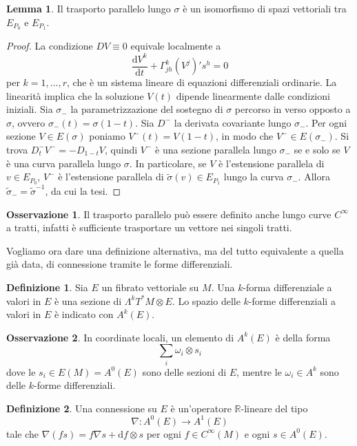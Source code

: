 \documentclass[a4paper,11pt]{article}
\theoremstyle{definition}
\newtheorem{osservazione}{Osservazione}[section]
\newtheorem{definizione}{Definizione}[section]
\theoremstyle{theorem}
\newtheorem{lemma}[teorema]{Lemma}
\newcommand{\dif}{\mathrm{d}}
\newcommand{\R}{\mathbb{R}}
\begin{document}
\begin{lemma}
	Il trasporto parallelo lungo $\sigma$ è un isomorfismo di spazi vettoriali tra $E_{P_0}$ e $E_{P_1}$.
\end{lemma}
\begin{proof}
	La condizione $DV\equiv0$ equivale localmente a
	\[\frac{\dif V^k}{\dif t}+\Gamma^k_{jh}\left(V^j\right)'s^h=0\]
	per $k=1,\dots,r$, che è un sistema lineare di equazioni differenziali ordinarie. La linearità implica che la soluzione $V(t)$ dipende linearmente dalle condizioni iniziali. Sia $\sigma_{-}$ la parametrizzazione del sostegno di $\sigma$ percorso in verso opposto a $\sigma$, ovvero $\sigma_-(t)=\sigma(1-t)$. Sia $D^-$ la derivata covariante lungo $\sigma_-$. Per ogni sezione $V\in E(\sigma)$ poniamo $V^-(t)=V(1-t)$, in modo che $V^-\in E(\sigma_-)$. Si trova $D^-_tV^-=-D_{1-t}V$, quindi $V^-$ è una sezione parallela lungo $\sigma_-$ se e solo se $V$ è una curva parallela lungo $\sigma$. In particolare, se $V$ è l'estensione parallela di $v\in E_{P_0}$, $V^-$ è l'estensione parallela di $\tilde{\sigma}(v)\in E_{P_1}$ lungo la curva $\sigma_-$. Allora $\tilde{\sigma}_-=\tilde{\sigma}^{-1}$, da cui la tesi.
\end{proof}
\begin{osservazione}
	Il trasporto parallelo può essere definito anche lungo curve $C^\infty$ a tratti, infatti è sufficiente trasportare un vettore nei singoli tratti.
\end{osservazione}
Vogliamo ora dare una definizione alternativa, ma del tutto equivalente a quella già data, di connessione tramite le forme differenziali.
\begin{definizione}
	Sia $E$ un fibrato vettoriale su $M$. Una $k$-forma differenziale a valori in $E$ è una sezione di $\Lambda^k T^*M\otimes E$. Lo spazio delle $k$-forme differenziali a valori in $E$ è indicato con $A^k(E)$.
\end{definizione}
\begin{osservazione}
	In coordinate locali, un elemento di $A^k(E)$ è della forma
	\[\sum_i\omega_i\otimes s_i\]
	dove le $s_i\in E(M)=A^0(E)$ sono delle sezioni di $E$, mentre le $\omega_i\in A^k$ sono delle $k$-forme differenziali.
\end{osservazione}
\begin{definizione}
	Una connessione su $E$ è un'operatore $\R$-lineare del tipo
	\[\nabla\colon A^0(E)\to A^1(E)\]
	tale che $\nabla(fs)=f\nabla s+\dif f\otimes s$ per ogni $f\in C^\infty(M)$ e ogni $s\in A^0(E)$.
\end{definizione}
\end{document}
